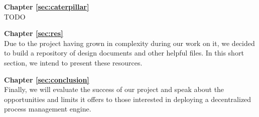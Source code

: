 \textbf{Chapter \ref{sec:caterpillar}} \\[0.2em]
TODO

\textbf{Chapter \ref{sec:res}} \\[0.2em]
Due to the project having grown in complexity during our work on it, we decided to build a repository of design documents and other helpful files. In this short section, we intend to present these resources.

\textbf{Chapter \ref{sec:conclusion}} \\[0.2em]
Finally, we will evaluate the success of our project and speak about the opportunities and limits it offers to those interested in deploying a decentralized process management engine.
